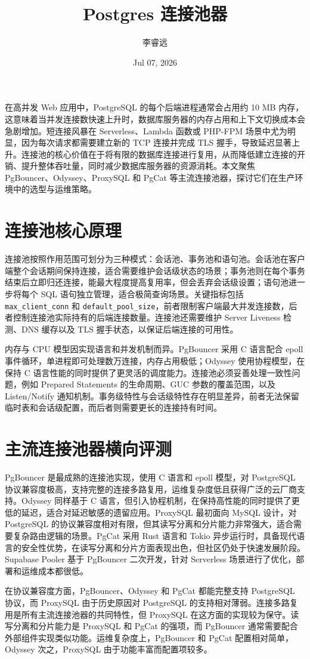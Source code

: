 \title{Postgres 连接池器}
\author{李睿远}
\date{Jul 07, 2026}
\maketitle
在高并发 Web 应用中，PostgreSQL 的每个后端进程通常会占用约 10 MB 内存，这意味着当并发连接数快速上升时，数据库服务器的内存占用和上下文切换成本会急剧增加。短连接风暴在 Serverless、Lambda 函数或 PHP-FPM 场景中尤为明显，因为每次请求都需要建立新的 TCP 连接并完成 TLS 握手，导致延迟显著上升。连接池的核心价值在于将有限的数据库连接进行复用，从而降低建立连接的开销、提升整体吞吐量，同时减少数据库服务器的资源消耗。本文聚焦 PgBouncer、Odyssey、ProxySQL 和 PgCat 等主流连接池器，探讨它们在生产环境中的选型与运维策略。\par
\chapter{连接池核心原理}
连接池按照作用范围可划分为三种模式：会话池、事务池和语句池。会话池在客户端整个会话期间保持连接，适合需要维护会话级状态的场景；事务池则在每个事务结束后立即归还连接，能最大程度提高复用率，但会丢弃会话级设置；语句池进一步将每个 SQL 语句独立管理，适合极简查询场景。关键指标包括 \texttt{max\_{}client\_{}conn} 和 \texttt{default\_{}pool\_{}size}，前者限制客户端最大并发连接数，后者控制连接池实际持有的后端连接数量。连接池还需要维护 Server Liveness 检测、DNS 缓存以及 TLS 握手状态，以保证后端连接的可用性。\par
内存与 CPU 模型因实现语言和并发机制而异。PgBouncer 采用 C 语言配合 epoll 事件循环，单进程即可处理数万连接，内存占用极低；Odyssey 使用协程模型，在保持 C 语言性能的同时提供了更灵活的调度能力。连接池必须妥善处理一致性问题，例如 Prepared Statements 的生命周期、GUC 参数的覆盖范围，以及 Listen/Notify 通知机制。事务级特性与会话级特性存在明显差异，前者无法保留临时表和会话级配置，而后者则需要更长的连接持有时间。\par
\chapter{主流连接池器横向评测}
PgBouncer 是最成熟的连接池实现，使用 C 语言和 epoll 模型，对 PostgreSQL 协议兼容度极高，支持完整的连接多路复用，运维复杂度低且获得广泛的云厂商支持。Odyssey 同样基于 C 语言，但引入协程机制，在保持高性能的同时提供了更低的延迟，适合对延迟敏感的遗留应用。ProxySQL 最初面向 MySQL 设计，对 PostgreSQL 的协议兼容度相对有限，但其读写分离和分片能力非常强大，适合需要复杂路由逻辑的场景。PgCat 采用 Rust 语言和 Tokio 异步运行时，具备现代语言的安全性优势，在读写分离和分片方面表现出色，但社区仍处于快速发展阶段。Supabase Pooler 基于 PgBouncer 二次开发，针对 Serverless 场景进行了优化，部署和运维成本都很低。\par
在协议兼容度方面，PgBouncer、Odyssey 和 PgCat 都能完整支持 PostgreSQL 协议，而 ProxySQL 由于历史原因对 PostgreSQL 的支持相对薄弱。连接多路复用是所有主流连接池器的共同特性，但 ProxySQL 在这方面的实现较为保守。读写分离和分片能力是 ProxySQL 和 PgCat 的强项，而 PgBouncer 通常需要配合外部组件实现类似功能。运维复杂度上，PgBouncer 和 PgCat 配置相对简单，Odyssey 次之，ProxySQL 由于功能丰富而配置项较多。\par
